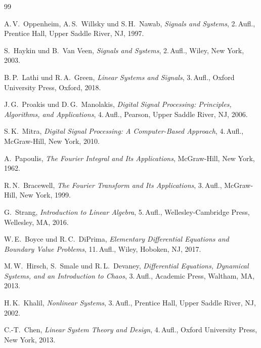 ﻿\documentclass[a4paper,12pt]{report}
\theoremstyle{definition}
\begin{document}
\begin{thebibliography}{99}

A.\,V.~Oppenheim, A.\,S.~Willsky und S.\,H.~Nawab,
\textit{Signals and Systems}, 2.\,Aufl.,
Prentice Hall, Upper Saddle River, NJ, 1997.

S.~Haykin und B.~Van Veen,
\textit{Signals and Systems}, 2.\,Aufl.,
Wiley, New York, 2003.

B.\,P.~Lathi und R.\,A.~Green,
\textit{Linear Systems and Signals}, 3.\,Aufl.,
Oxford University Press, Oxford, 2018.

J.\,G.~Proakis und D.\,G.~Manolakis,
\textit{Digital Signal Processing: Principles, Algorithms, and Applications},
4.\,Aufl., Pearson, Upper Saddle River, NJ, 2006.

S.\,K.~Mitra,
\textit{Digital Signal Processing: A Computer-Based Approach},
4.\,Aufl., McGraw-Hill, New York, 2010.

A.~Papoulis,
\textit{The Fourier Integral and Its Applications},
McGraw-Hill, New York, 1962.

R.\,N.~Bracewell,
\textit{The Fourier Transform and Its Applications},
3.\,Aufl., McGraw-Hill, New York, 1999.

G.~Strang,
\textit{Introduction to Linear Algebra},
5.\,Aufl., Wellesley-Cambridge Press, Wellesley, MA, 2016.

W.\,E.~Boyce und R.\,C.~DiPrima,
\textit{Elementary Differential Equations and Boundary Value Problems},
11.\,Aufl., Wiley, Hoboken, NJ, 2017.

M.\,W.~Hirsch, S.~Smale und R.\,L.~Devaney,
\textit{Differential Equations, Dynamical Systems, and an Introduction to Chaos},
3.\,Aufl., Academic Press, Waltham, MA, 2013.

H.\,K.~Khalil,
\textit{Nonlinear Systems},
3.\,Aufl., Prentice Hall, Upper Saddle River, NJ, 2002.

C.-T.~Chen,
\textit{Linear System Theory and Design},
4.\,Aufl., Oxford University Press, New York, 2013.


\end{thebibliography}
\end{document}
